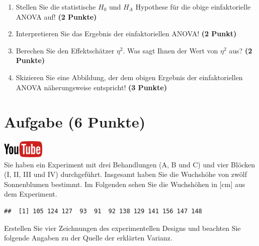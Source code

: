 \documentclass[a4paper, 10pt]{scrartcl}\usepackage[]{graphicx}\usepackage[]{xcolor}
\makeatletter
\newenvironment{kframe}{%
 \def\at@end@of@kframe{}%
 \ifinner\ifhmode%
  \def\at@end@of@kframe{\end{minipage}}%
  \begin{minipage}{\columnwidth}%
 \fi\fi%
 \def\FrameCommand##1{\hskip\@totalleftmargin \hskip-\fboxsep
 \colorbox{shadecolor}{##1}\hskip-\fboxsep
     \hskip-\linewidth \hskip-\@totalleftmargin \hskip\columnwidth}%
 \MakeFramed {\advance\hsize-\width
   \@totalleftmargin\z@ \linewidth\hsize
   \@setminipage}}%
 {\par\unskip\endMakeFramed%
 \at@end@of@kframe}
\newenvironment{knitrout}{}{} %
\makeatother
\begin{document}
\begin{enumerate}
\item Stellen Sie die statistische $H_0$ und $H_A$ Hypothese f{\"u}r die obige
  einfaktorielle ANOVA auf! \textbf{(2 Punkte)}
\item Interpretieren Sie das Ergebnis der einfaktoriellen ANOVA! \textbf{(2 Punkt)} 
\item Berechen Sie den Effektsch{\"a}tzer $\eta^2$. Was sagt Ihnen der Wert von
  $\eta^2$ aus? \textbf{(2 Punkte)}
\item Skizieren Sie eine Abbildung, der dem obigen Ergebnis der
  einfaktoriellen ANOVA n{\"a}herungsweise entspricht! \textbf{(3 Punkte)}
\end{enumerate}

 
\clearpage

\section{Aufgabe \hfill (6 Punkte)}

\hfill\href{https://youtu.be/zDK2dhgtFt0}{\includegraphics[width =
  2cm]{img/youtube}}\\[1Ex]


Sie haben ein Experiment mit drei Behandlungen (A, B und C) und vier
Bl{\"o}cken (I, II, III und IV) durchgef{\"u}hrt. Insgesamt haben Sie die Wuchsh{\"o}he
von zw{\"o}lf Sonnenblumen bestimmt. Im Folgenden sehen Sie die Wuchsh{\"o}hen in
[cm] aus dem Experiment.


\begin{knitrout}
\color{fgcolor}\begin{kframe}
\begin{verbatim}
##  [1] 105 124 127  93  91  92 138 129 141 156 147 148
\end{verbatim}
\end{kframe}
\end{knitrout}

Erstellen Sie vier Zeichnungen des experimentellen Designs und beachten
Sie folgende Angaben zu der Quelle der erkl{\"a}rten Varianz. 
\end{document}

